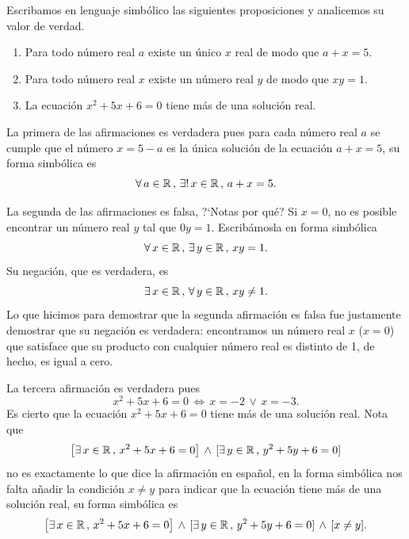 \begin{ejemplo}
	Escribamos en lenguaje simb\'olico las siguientes proposiciones y analicemos 
	su valor de verdad.
	\begin{enumerate}
		\item Para todo n\'umero real $a$ existe un \'unico $x$ real de
			modo que $a+x = 5$.
		\item Para todo n\'umero real $x$ existe un n\'umero real $y$
			de modo que $xy=1$.
		\item La ecuaci\'on $x^2+5x+6=0$ tiene m\'as de una soluci\'on real.
	\end{enumerate}

	La primera de las afirmaciones es verdadera pues para cada
	n\'umero real $a$ se cumple que 
	el n\'umero $x = 5-a$ es la \'unica soluci\'on de la ecuaci\'on
	$a+x=5$, su forma simb\'olica es
	\[
		\forall\,a \in \mathbb{R}\,,\,\exists !\, x \in \mathbb{R}\,,\, a+x=5.
	\]
	
	La segunda de las afirmaciones es falsa, ?`Notas por qu\'e? 
	Si $x=0$, no es posible encontrar un n\'umero real $y$
	tal que $0 y = 1$. Escrib\'amosla en forma simb\'olica
	\[
		\forall\, x \in \mathbb{R}\,,\, \exists\, y\in \mathbb{R}\,,\, x y = 1.
	\]
	Su negaci\'on, que es verdadera, es
	\[
		\exists\, x \in \mathbb{R}\,,\, \forall\,y\in \mathbb{R}\,,\, xy \ne 1.
	\]
	Lo que hicimos para demostrar que la segunda afirmaci\'on
	es falsa fue justamente demostrar que su negaci\'on es verdadera:
	encontramos un n\'umero real $x$ ($x=0$) que satisface que
	su producto con cualquier n\'umero real es distinto de 1, de hecho, 
	es igual a cero.
	
	La tercera afirmaci\'on es verdadera pues
	\[
		x^2 + 5x + 6 = 0\, \Leftrightarrow\, x = -2\,\vee\, x = -3.
	\]
	Es cierto que la ecuaci\'on $x^2+5x+6=0$ tiene m\'as de una soluci\'on
	real.
	Nota que 
	\[
		\left[\exists\,x\in \mathbb{R}\,,\,x^2+5x+6 = 0\right]
		\,\wedge\,[\exists\,y\in \mathbb{R}\,,\,y^2+5y+6 = 0]
	\]
	no es exactamente lo que dice la afirmaci\'on en espa\~nol,
	en la forma simb\'olica nos falta a\~nadir la condici\'on $x\ne y$
	para indicar que la ecuaci\'on tiene m\'as de una soluci\'on real,
	su forma simb\'olica es
	\[
		\left[\exists\,x\in \mathbb{R}\,,\,x^2+5x+6 = 0\right]
		\,\wedge\,[\exists\,y\in \mathbb{R}\,,\,y^2+5y+6 = 0]\,\wedge\,[x\ne y].
	\]
\end{ejemplo}

\medskip

